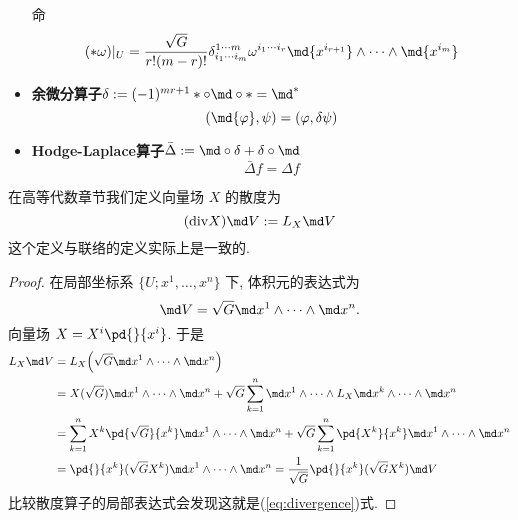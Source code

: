 \begin{itemize}
        命
        \begin{equation*}
            (*\omega)|_U=\frac{\sqrt{G}}{r!(m-r)!}\delta^{1\cdots m}_{i_1\cdots i_m}\omega^{i_1\cdots i_r}\md{x^{i_{r+1}}}\wedge\cdots\wedge\md{x^{i_m}}
        \end{equation*}
        \item \textbf{余微分算子}$\delta := (-1)^{mr+1}*\circ\md\circ*=\md^*$
        \begin{equation*}
            (\md{\varphi},\psi)=(\varphi, \delta\psi)
        \end{equation*}
        \item \textbf{Hodge-Laplace算子}$\bar{\Delta}:=\md\circ\delta+\delta\circ\md$
        \begin{equation*}
            \bar{\Delta}f=\Delta f
        \end{equation*}
    \end{itemize}

    \begin{proposition}
        在高等代数章节我们定义向量场 $X$ 的散度为 
        \begin{equation}\label{eq:divergence}
            (\mathrm{div}X)\md V:= L_X\md V
        \end{equation}
        这个定义与联络的定义实际上是一致的.
    \end{proposition}
    \begin{proof}
        在局部坐标系 $\{U;x^1,\dots,x^n\}$ 下, 体积元的表达式为
        \begin{equation*}
            \md V = \sqrt{G}\md x^1\wedge\cdots\wedge\md x^n.
        \end{equation*}
        向量场 $X = X^i\pd{}{x^i}$. 于是
        \begin{align*}
            L_X\md V &= L_X\Big(\sqrt{G}\md x^1\wedge\cdots\wedge\md x^n\Big) \\
            &= X(\sqrt{G})\md x^1\wedge\cdots\wedge\md x^n + \sqrt{G}\sum_{k = 1}^{n}\md x^1\wedge\cdots\wedge L_X\md x^k\wedge\cdots\wedge\md x^n \\
            &= \sum_{k=1}^{n}X^k\pd{\sqrt{G}}{x^k}\md x^1\wedge\cdots\wedge\md x^n + \sqrt{G}\sum_{k = 1}^{n}\pd{X^k}{x^k}\md x^1\wedge\cdots\wedge\md x^n \\
            &= \pd{}{x^k}(\sqrt{G}X^k)\md x^1\wedge\cdots\wedge\md x^n = \frac{1}{\sqrt{G}}\pd{}{x^k}(\sqrt{G}X^k)\md V
        \end{align*}
        比较散度算子的局部表达式会发现这就是(\ref{eq:divergence})式.
    \end{proof}

